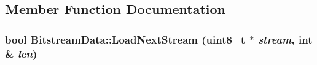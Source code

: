 \subsection{Member Function Documentation}
\hypertarget{class_bitstream_data_a9475d45cccc6018ece6dec99caad1e58}{
\subsubsection[{LoadNextStream}]{\setlength{\rightskip}{0pt plus 5cm}bool BitstreamData::LoadNextStream ({\bf uint8\_\-t} $\ast$ {\em stream}, \/  int \& {\em len})}}
\label{class_bitstream_data_a9475d45cccc6018ece6dec99caad1e58}




